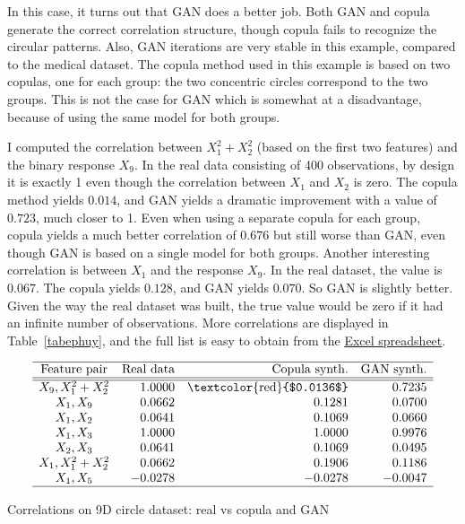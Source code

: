 \documentclass[oneside,10pt]{book}
\renewcommand{\arraystretch}{1.4} %
\begin{document}
In this case, it turns out that GAN does a better job. Both GAN and copula generate the correct correlation structure, though copula fails to recognize the circular patterns. Also, GAN iterations are very stable in this example, compared to the medical dataset.  
The copula method used in this example is based on two copulas, one for each group: the two concentric circles correspond to the two groups. This is not the case for GAN which is  somewhat at a disadvantage,
 because of using the same model for both groups. 

I computed the correlation between $X_1^2 + X_2^2$ (based on the first two features) and the binary response $X_9$. In the real data consisting of 400 observations, by design it is exactly 1 even though the correlation between $X_1$ and $X_2$ is zero. 
The copula method yields $0.014$, and GAN yields a dramatic improvement with a value of $0.723$, much closer to 1. Even when using a separate copula
 for each group, copula yields a much better correlation of $0.676$ but still worse than GAN, even though GAN  is based on  a single model for both groups. Another interesting correlation is between $X_1$ and the response $X_9$. In the real dataset,
 the value is $0.067$. The copula yields 
$0.128$, and GAN yields $0.070$.  So GAN is slightly better. 
Given the way the real dataset was built, the true value would be zero if it had an infinite number
of observations.  More correlations are displayed in Table~\ref{tabephuy}, and the full list is easy to obtain from the 
\href{https://github.com/VincentGranville/Main/blob/main/circle8D.xlsx}{Excel spreadsheet}.


\renewcommand{\arraystretch}{1.2} %
\renewcommand{\arraystretch}{1.2} %
\begin{table}[H]
\[
\begin{array}{crrr}
\hline
 \text{Feature pair} &  \text{Real data} & \text{Copula synth.} & \text{GAN synth.} \\
\hline
\hline
X_9, X_1^2+X_2^2  & 1.0000 & \text{\textcolor{red}{$0.0136$}} & 0.7235 \\
X_1, X_9 &  0.0662&	0.1281 &	0.0700\\
X_1, X_2 &  0.0641 &	0.1069 &	0.0660\\
X_1, X_3 & 1.0000 &	1.0000 &	0.9976 \\
 X_2, X_3 & 0.0641 &	0.1069 &	0.0495\\
 X_1, X_1^2+X_2^2 & 0.0662 &	0.1906 &	0.1186\\
 X_1, X_5 & -0.0278 & -0.0278 &	-0.0047\\

\hline
\end{array}
\]
\caption{\label{tabephuy} Correlations on 9D circle dataset: real vs copula and GAN}
\end{table}
\end{document}
